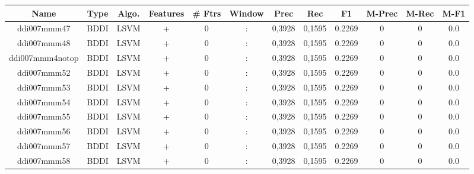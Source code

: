 \documentclass[a4paper]{article}
\begin{document}
\begin{landscape}
\begin{center}
\begin{tabular}{ |c|c|c|c|c|c|c|c|c|c|c|c|} 
 \hline
 	Name & Type & Algo. & Features & \# Ftrs & Window & Prec & Rec & F1 & M-Prec & M-Rec & M-F1\\
 \hline

 	

 
 	
 	\small{ ddi007mmm47 } & BDDI & LSVM & +  &  0 &  :  &  0,3928 & 0,1595 & 0.2269  &  0 & 0 & 0.0 \\
 	

 
 	
 	\small{ ddi007mmm48 } & BDDI & LSVM & +  &  0 &  :  &  0,3928 & 0,1595 & 0.2269  &  0 & 0 & 0.0 \\
 	

 
 	
 	\small{ ddi007mmm4notop } & BDDI & LSVM & +  &  0 &  :  &  0,3928 & 0,1595 & 0.2269  &  0 & 0 & 0.0 \\
 	

 
 	
 	\small{ ddi007mmm52 } & BDDI & LSVM & +  &  0 &  :  &  0,3928 & 0,1595 & 0.2269  &  0 & 0 & 0.0 \\
 	

 
 	
 	\small{ ddi007mmm53 } & BDDI & LSVM & +  &  0 &  :  &  0,3928 & 0,1595 & 0.2269  &  0 & 0 & 0.0 \\
 	

 
 	
 	\small{ ddi007mmm54 } & BDDI & LSVM & +  &  0 &  :  &  0,3928 & 0,1595 & 0.2269  &  0 & 0 & 0.0 \\
 	

 
 	
 	\small{ ddi007mmm55 } & BDDI & LSVM & +  &  0 &  :  &  0,3928 & 0,1595 & 0.2269  &  0 & 0 & 0.0 \\
 	

 
 	
 	\small{ ddi007mmm56 } & BDDI & LSVM & +  &  0 &  :  &  0,3928 & 0,1595 & 0.2269  &  0 & 0 & 0.0 \\
 	

 
 	
 	\small{ ddi007mmm57 } & BDDI & LSVM & +  &  0 &  :  &  0,3928 & 0,1595 & 0.2269  &  0 & 0 & 0.0 \\
 	

 
 	
 	\small{ ddi007mmm58 } & BDDI & LSVM & +  &  0 &  :  &  0,3928 & 0,1595 & 0.2269  &  0 & 0 & 0.0 \\
 	


\end{tabular}
\end{center}
\end{landscape}
\end{document}
